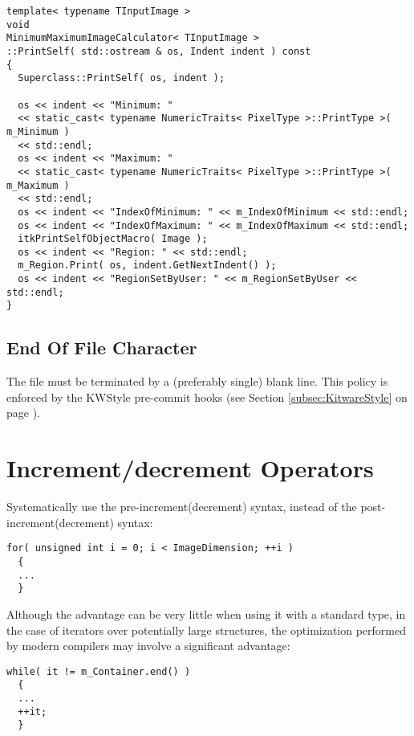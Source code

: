 \small
\begin{verbatim}
template< typename TInputImage >
void
MinimumMaximumImageCalculator< TInputImage >
::PrintSelf( std::ostream & os, Indent indent ) const
{
  Superclass::PrintSelf( os, indent );

  os << indent << "Minimum: "
  << static_cast< typename NumericTraits< PixelType >::PrintType >( m_Minimum )
  << std::endl;
  os << indent << "Maximum: "
  << static_cast< typename NumericTraits< PixelType >::PrintType >( m_Maximum )
  << std::endl;
  os << indent << "IndexOfMinimum: " << m_IndexOfMinimum << std::endl;
  os << indent << "IndexOfMaximum: " << m_IndexOfMaximum << std::endl;
  itkPrintSelfObjectMacro( Image );
  os << indent << "Region: " << std::endl;
  m_Region.Print( os, indent.GetNextIndent() );
  os << indent << "RegionSetByUser: " << m_RegionSetByUser << std::endl;
}
\end{verbatim}
\normalsize


\subsection{End Of File Character}
\label{subsec:EndOfFileCharacter}

The file must be terminated by a (preferably single) blank line.
This policy is enforced by the KWStyle pre-commit hooks (see Section
\ref{subsec:KitwareStyle} on page \pageref{subsec:KitwareStyle}).


\section{Increment/decrement Operators}
\label{sec:IncrementDecrementOperators}

Systematically use the pre-increment(decrement) syntax, instead of the
post-increment(decrement) syntax:

\small
\begin{verbatim}
for( unsigned int i = 0; i < ImageDimension; ++i )
  {
  ...
  }
\end{verbatim}
\normalsize

Although the advantage can be very little when using it with a standard type,
in the case of iterators over potentially large structures, the optimization
performed by modern compilers may involve a significant advantage:

\small
\begin{verbatim}
while( it != m_Container.end() )
  {
  ...
  ++it;
  }
\end{verbatim}
\normalsize


